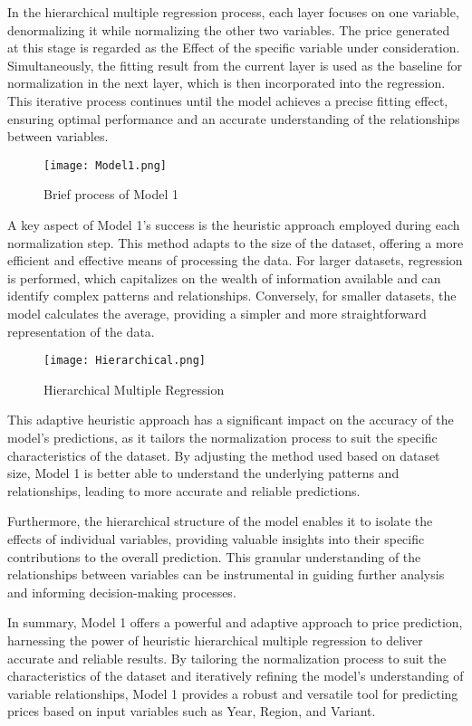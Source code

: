 \documentclass[12pt]{article}  %
\begin{document}
In the hierarchical multiple regression process, each layer focuses on one variable, denormalizing it while normalizing the other two variables. The price generated at this stage is regarded as the Effect of the specific variable under consideration. Simultaneously, the fitting result from the current layer is used as the baseline for normalization in the next layer, which is then incorporated into the regression. This iterative process continues until the model achieves a precise fitting effect, ensuring optimal performance and an accurate understanding of the relationships between variables.
\begin{figure}[htbp]
    \centering
    \texttt{[image: Model1.png]}
    \caption{Brief process of Model 1}\label{fig:Model1}
\end{figure}
A key aspect of Model 1's success is the heuristic approach employed during each normalization step. This method adapts to the size of the dataset, offering a more efficient and effective means of processing the data. For larger datasets, regression is performed, which capitalizes on the wealth of information available and can identify complex patterns and relationships. Conversely, for smaller datasets, the model calculates the average, providing a simpler and more straightforward representation of the data.

\begin{figure}[htbp]
    \centering
    \texttt{[image: Hierarchical.png]}
    \caption{Hierarchical Multiple Regression}\label{fig:Hierarchical}
\end{figure}

This adaptive heuristic approach has a significant impact on the accuracy of the model's predictions, as it tailors the normalization process to suit the specific characteristics of the dataset. By adjusting the method used based on dataset size, Model 1 is better able to understand the underlying patterns and relationships, leading to more accurate and reliable predictions.

Furthermore, the hierarchical structure of the model enables it to isolate the effects of individual variables, providing valuable insights into their specific contributions to the overall prediction. This granular understanding of the relationships between variables can be instrumental in guiding further analysis and informing decision-making processes.

In summary, Model 1 offers a powerful and adaptive approach to price prediction, harnessing the power of heuristic hierarchical multiple regression to deliver accurate and reliable results. By tailoring the normalization process to suit the characteristics of the dataset and iteratively refining the model's understanding of variable relationships, Model 1 provides a robust and versatile tool for predicting prices based on input variables such as Year, Region, and Variant.
\end{document}
